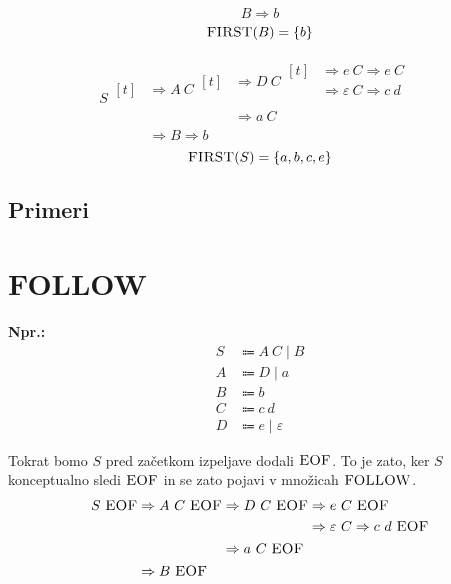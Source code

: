 \documentclass{article}
\newcommand{\Ex}{\textbf{Npr.:}\ }
\newcommand{\FIRST}{\textsc{FIRST}}
\newcommand{\FOLLOW}{\textsc{FOLLOW}}
\newcommand{\EOF}{\textsc{EOF}}
\newcommand{\Null}{\varepsilon}
\newcommand{\Arrow}{\Coloneqq}
\newcommand{\Derive}{\Rightarrow}
\newcommand{\Seq}{\ }
\newcommand{\Union}{\mathrel{|}}
\begin{document}
\begin{equation*}
  B \Derive b
\end{equation*}
\begin{equation*}
  \FIRST(B) = \{b\}
\end{equation*}

\begin{equation*}
  S \begin{aligned}[t]
    &\Derive A \Seq C \begin{aligned}[t]
      &\Derive D \Seq C \begin{aligned}[t]
        &\Derive e \Seq C \Derive e \Seq C \\
        &\Derive \Null \Seq C \Derive c \Seq d \\
      \end{aligned}\\
      &\Derive a \Seq C
    \end{aligned}\\
  &\Derive B \Derive b
  \end{aligned}
\end{equation*}
\begin{equation*}
  \FIRST(S) = \{a, b, c, e\}
\end{equation*}

\subsection*{Primeri}

\section{\FOLLOW}
\Ex
  \begin{equation*}
  \begin{aligned}
    S &\Arrow A \Seq C \Union B \\
    A &\Arrow D \Union a \\
    B &\Arrow b\\
    C &\Arrow c \Seq d\\
    D &\Arrow e \Union \Null
  \end{aligned}
\end{equation*}

Tokrat bomo $S$ pred začetkom izpeljave dodali $\EOF$.
To je zato, ker $S$ konceptualno sledi $\EOF$ in se zato pojavi v množicah $\FOLLOW$.
\begin{equation*}
  S \Seq \EOF \begin{aligned}[t]
    &\Derive A \Seq C \Seq \EOF \begin{aligned}[t]
      &\Derive D \Seq C \Seq \EOF \begin{aligned}[t]
        &\Derive e \Seq C \Seq \EOF\\
        &\Derive \Null \Seq C \Derive c \Seq d \Seq \EOF
      \end{aligned}\\
      &\Derive a \Seq C \Seq \EOF
    \end{aligned}\\
  &\Derive B \Seq \EOF
  \end{aligned}
\end{equation*}
\end{document}
